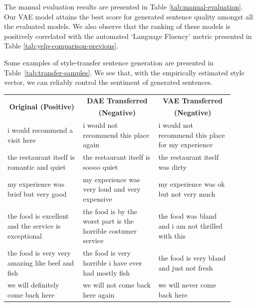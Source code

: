\documentclass[letterpaper]{article} %
\newcommand{\tabh}[1]{\multicolumn{1}{c|}{\textbf{#1}}}
\newcommand{\tabc}[2]{\multicolumn{1}{|c||}{\multirow{#1}{*}{\textbf{#2}}}}
\begin{document}
The manual evaluation results are presented in Table \ref{tab:manual-evaluation}. Our VAE model attains the best score for generated sentence quality amongst all the evaluated models. We also observe that the ranking of these models is positively correlated with the automated `Language Fluency' metric presented in Table \ref{tab:yelp-comparison-previous}.

Some examples of style-transfer sentence generation are presented in Table~\ref{tab:transfer-samples}. We see that, with the empirically estimated style vector, we can reliably control the sentiment of generated sentences.

\begin{table}[ht]
	\centering
	\small
	\begin{tabular}{| p{0.3\linewidth} || p{0.3\linewidth} | p{0.3\linewidth} |}
		\hline
		\tabc{2}{Original (Positive)}                          & \tabh{DAE Transferred}                                         & \tabh{VAE Transferred}                                      \\
		                                                       & \tabh{(Negative)}                                              & \tabh{(Negative)}                                           \\
		\hline
		\hline
		i would recommend a visit here                         & i would not recommend this place again                         & i would not recommend this place for my experience          \\
		\hline
		the restaurant itself is romantic and quiet            & the restaurant itself is soooo quiet                           & the restaurant itself was dirty                             \\
		\hline
		my experience was brief but very good                  & my experience was very loud and very expensive                 & my experience was ok but not very much                      \\
		\hline
		the food is excellent and the service is exceptional   & the food is by the worst part is the horrible costumer service & the food was bland and i am not thrilled with this          \\
		\hline
		the food is very very amazing like beef and fish       & the food is very horrible i have ever had mostly fish          & the food is very bland and just not fresh                   \\
		\hline
		we will definitely come back here                      & we will not come back here again                               & we will never come back here                                \\

\end{tabular}
\end{table}
\end{document}
